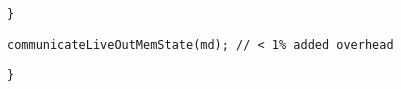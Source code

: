 \begin{lstlisting}[morekeywords={pathcost}, aboveskip=0pt, belowskip=0pt, firstnumber=auto,name=dij_checks]
  }
    \end{lstlisting}

  \begin{lstlisting}[morekeywords={pathcost}, aboveskip=0pt,belowskip=0pt,backgroundcolor=\color{lightgray},
  firstnumber=auto, name=dij_checks]
  communicateLiveOutMemState(md); // < 1% added overhead
  \end{lstlisting}

\begin{lstlisting}[morekeywords={pathcost}, aboveskip=0pt, belowskip=0pt,
firstnumber=auto,name=dij_checks]
}
\end{lstlisting}
